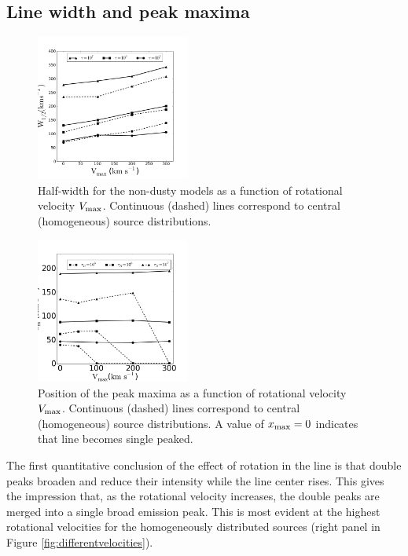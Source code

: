\documentclass{emulateapj}
\newcommand{\ly}{{\ifmmode{{\rm Ly}\alpha~}\else{Ly$\alpha$~}\fi}}
\begin{document}
\subsection{Line width and peak maxima}
\label{sec:widthpeak}


\begin{figure}
    \includegraphics[width=0.45\textwidth]{NewWidthVvsVmax.png}
    \caption{Half-width for the non-dusty models as a function of
      rotational velocity $V_{\rm max}$. Continuous (dashed) lines
      correspond to central (homogeneous) source
      distributions. \label{fig:widthvsvelocity}} 
\end{figure}


\begin{figure}
    \includegraphics[width=0.45\textwidth]{maximumVvsVmax.png}
\caption{Position of the peak maxima as a function of rotational
  velocity $V_{\rm max}$. Continuous (dashed) lines correspond to
  central (homogeneous) source distributions. A value of $x_{\rm
    max}=0$ indicates that line becomes single
  peaked. \label{fig:maximumsvsvelocity}}  
\end{figure}

The first quantitative conclusion of the effect of rotation in the
\ly line is that double peaks broaden and reduce their intensity
while the line center rises. This gives the impression that, as the
rotational velocity increases, the double peaks are merged into a
single broad emission peak. This is most evident at the highest
rotational velocities for the homogeneously distributed sources
(right panel in Figure \ref{fig:differentvelocities}). 
\end{document}
